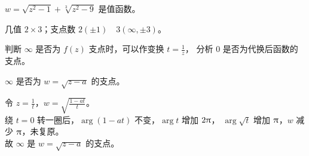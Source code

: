 \documentclass[12pt, a4paper, oneside, UTF8]{ctexbook}
\begin{document}
\begin{example}{}
    $w=\sqrt{z^2-1}+\sqrt[3]{z^2-9}$ 是值函数。
\end{example}
\begin{solution}{}
    几值 $2\times 3$；支点数 $2(\pm 1)\quad 3(\infty,\pm 3)$。
\end{solution}

 判断 $\infty$ 是否为 $f(z)$ 支点时，可以作变换 $t=\frac{1}{z}$，
分析 $0$ 是否为代换后函数的支点。
\begin{example}{}
    $\infty$ 是否为 $w=\sqrt{z-a}$ 的支点。
\end{example}
\begin{solution}{}
    令 $z=\frac{1}{t}$，$w=\sqrt{\frac{1-at}{t}}$。\\
    绕 $t=0$ 转一圈后，$\arg (1-at)$ 不变，$\arg t$ 增加 $2\uppi$，
    $\arg \sqrt{t}$ 增加 $\uppi$，$w$ 减少 $\uppi$，未复原。\\
    故 $\infty$ 是 $w=\sqrt{z-a}$ 的支点。
\end{solution}

\ifx\allfiles\undefined
\end{document}
